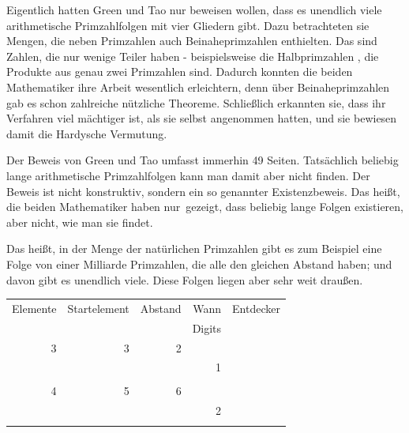 \begin{refsegment}
\begin{itemize}
     Eigentlich hatten Green und Tao nur beweisen wollen, dass es unendlich
     viele arithmetische Primzahlfolgen mit vier Gliedern gibt. Dazu
     betrachteten sie Mengen, die neben Primzahlen auch
     Beinaheprimzahlen
     enthielten. Das sind Zahlen, die nur wenige Teiler haben - beispielsweise
     die Halbprimzahlen%
     ,
     die Produkte aus genau zwei Primzahlen sind.
     Dadurch konnten die beiden Mathematiker ihre Arbeit wesentlich
     erleichtern, denn über Beinaheprimzahlen gab es schon zahlreiche
     nützliche Theoreme. Schließlich erkannten sie, dass ihr Verfahren viel
     mächtiger ist, als sie selbst angenommen hatten, und sie bewiesen damit
     die Hardysche Vermutung.

     Der Beweis von Green und Tao umfasst immerhin 49 Seiten. Tatsächlich
     beliebig lange arithmetische Primzahlfolgen kann man damit aber nicht
     finden. Der Beweis ist nicht konstruktiv, sondern ein so genannter
     Existenzbeweis.
     Das heißt, die beiden Mathematiker haben \glqq nur\grqq~gezeigt, dass
     beliebig lange Folgen existieren, aber nicht, wie man sie findet.

     Das heißt, in der Menge der natürlichen Primzahlen gibt es zum Beispiel
     eine Folge von einer Milliarde Primzahlen, die alle den gleichen Abstand
     haben; und davon gibt es unendlich viele. Diese Folgen liegen aber sehr
     \glqq weit draußen\grqq.   %


     \begin{table}[ht]
     \begin{center}
     \begin{tabular}{|r|r|r|r|r|}
     \hline
     Elemente & Startelement & Abstand & Wann   & Entdecker \\
              &              &         & Digits &           \\ \hline

      3 &                   3 &                   2 &      & \\
        &                     &                     &    1 & \\
	&&&& \\

      4 &                   5 &                   6 &      & \\
        &                     &                     &    2 & \\
	&&&& \\


\end{tabular}
\end{center}
\end{table}
\end{itemize}
\end{refsegment}
